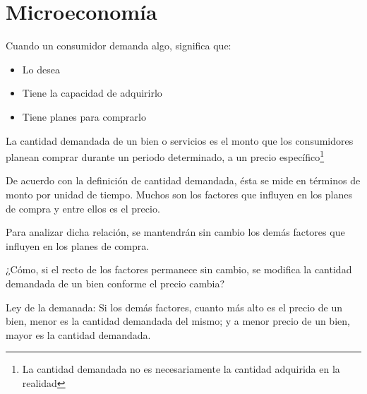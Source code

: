 \section{Microeconomía}
Cuando un consumidor demanda algo, significa que:
\begin{itemize}
    \item Lo desea
    \item Tiene la capacidad de adquirirlo
    \item Tiene planes para comprarlo
\end{itemize}
La cantidad demandada de un bien o servicios es el monto que los consumidores planean comprar durante un periodo determinado, a un precio específico\footnote{La cantidad demandada no es necesariamente la cantidad adquirida en la realidad}

De acuerdo con la definición de cantidad demandada, ésta se mide en términos de monto por unidad de tiempo. Muchos son los factores que influyen en los planes de compra y entre ellos es el precio.

Para analizar dicha relación, se mantendrán sin cambio los demás factores que influyen en los planes de compra.

¿Cómo, si el recto de los factores permanece sin cambio, se modifica la cantidad demandada de un bien conforme el precio cambia?

Ley de la demanada: Si los demás factores, cuanto más alto es el precio de un bien, menor es la cantidad demandada del mismo; y a menor precio de un bien, mayor es la cantidad demandada.
